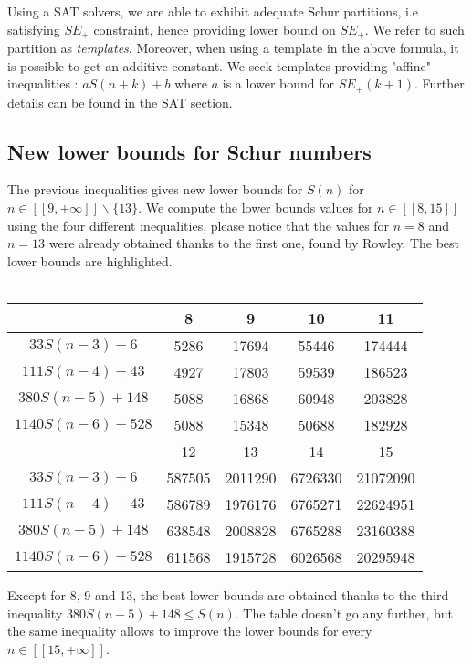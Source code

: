 \documentclass{article}
\newtheorem{computational theorem}{Computational Theorem}[section]
\begin{document}
Using a SAT solvers, we are able to exhibit adequate Schur partitions, i.e satisfying \(SE_+\) constraint, 
hence providing lower bound on \(SE_+\). We refer to such partition as \textit{templates}. Moreover, when using 
a template in the above formula, it is possible to get an additive constant. We seek templates providing "affine"
inequalities : \(aS(n+k) + b \) where \(a\) is a lower bound for \(SE_+(k+1)\). Further details can be found in the \hyperref[SAT]{SAT section}.

\subsection{New lower bounds for Schur numbers}

The previous inequalities gives new lower bounds for \(S(n)\) for
\( n \in [\![9,+\infty]\!] \backslash \{13\} \). We compute the lower
bounds values for \( n \in [\![8,15]\!] \) using the four different inequalities, please notice that the values for \( n = 8\) and \(n = 13\) were already obtained thanks to the first one, found by Rowley. The best lower bounds are highlighted.\\
\\
\begin{center}
\begin{tabular}{|*{5}{c|}}
    \hline
	 & 8 & 9 & 10 & 11 \\
	\hline
	\(33S(n-3) + 6 \) & \cellcolor{yellow} 5286 & 17694 & 55446 & 174444\\
	\hline
	\(111S(n-4) + 43 \) & 4927 & \cellcolor{yellow} 17803 & 59539 & 186523\\
	\hline
	\(380S(n-5) + 148 \) & 5088 & 16868 & \cellcolor{yellow} 60948 & \cellcolor{yellow} 203828 \\
	\hline
	\(1140S(n-6) + 528 \) & 5088 & 15348 & 50688 & 182928\\
	\hline
	\hline
	& 12 & 13 & 14 & 15 \\
	\hline
	\(33S(n-3) + 6 \) & 587505 & \cellcolor{yellow} 2011290 & 6726330 & 21072090\\
	\hline
	\(111S(n-4) + 43 \) & 586789 & 1976176 & 6765271 & 22624951 \\
	\hline
	\(380S(n-5) + 148 \) & \cellcolor{yellow} 638548 & 2008828 & \cellcolor{yellow} 6765288 & \cellcolor{yellow} 23160388 \\
	\hline
	\(1140S(n-6) + 528 \) & 611568 & 1915728 & 6026568 & 20295948 \\
	\hline
\end{tabular}
\end{center}
Except for 8, 9 and 13, the best lower bounds are obtained thanks to the third inequality \( 380S(n-5) + 148 \leqslant S(n) \). The table doesn't go any further, but the same inequality allows to improve the lower bounds for every \( n \in [\![15,+\infty]\!] \).
\end{document}
